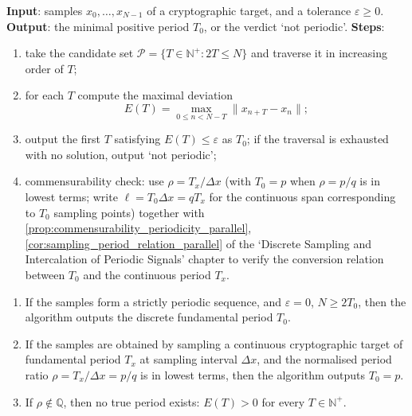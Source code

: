 \begin{definition}\label{def:crypto_minimal_period_algorithm}
\textbf{Input}: samples \(x_0,\dots,x_{N-1}\) of a cryptographic target, and a tolerance \(\varepsilon\ge0\).
\textbf{Output}: the minimal positive period \(T_0\), or the verdict `not periodic'.
\textbf{Steps}:
\begin{enumerate}[label=(\arabic*)]
    \item take the candidate set \(\mathcal P=\{T\in\mathbb N^+:2T\le N\}\) and traverse it in increasing order of \(T\);
    \item for each \(T\) compute the maximal deviation
    \[
    E(T)=\max_{0\le n<N-T}\|x_{n+T}-x_n\|;
    \]
    \item output the first \(T\) satisfying \(E(T)\le\varepsilon\) as \(T_0\); if the traversal is exhausted with no solution, output `not periodic';
    \item commensurability check: use \(\rho=T_x/\Delta x\) (with \(T_0=p\) when \(\rho=p/q\) is in lowest terms; write \(\ell=T_0\Delta x=qT_x\) for the continuous span corresponding to \(T_0\) sampling points) together with \cref{prop:commensurability_periodicity_parallel}, \cref{cor:sampling_period_relation_parallel} of the `Discrete Sampling and Intercalation of Periodic Signals' chapter to verify the conversion relation between \(T_0\) and the continuous period \(T_x\).
\end{enumerate}
\end{definition}

\begin{theorem}\label{thm:crypto_minimal_period_correctness}
\leavevmode\par
\begin{enumerate}[label=(\roman*)]
    \item If the samples form a strictly periodic sequence, and \(\varepsilon=0\), \(N\ge2T_0\), then the algorithm outputs the discrete fundamental period \(T_0\).
    \item If the samples are obtained by sampling a continuous cryptographic target of fundamental period \(T_x\) at sampling interval \(\Delta x\), and the normalised period ratio \(\rho=T_x/\Delta x=p/q\) is in lowest terms, then the algorithm outputs \(T_0=p\).
    \item If \(\rho\notin\mathbb Q\), then no true period exists: \(E(T)>0\) for every \(T\in\mathbb N^+\).
\end{enumerate}
\end{theorem}

